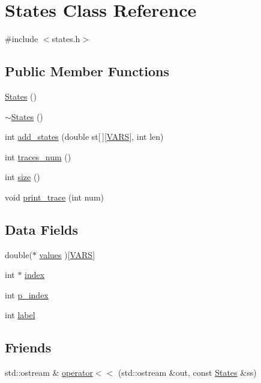 \hypertarget{classStates}{}\section{States Class Reference}
\label{classStates}


{\ttfamily \#include $<$states.\+h$>$}

\subsection*{Public Member Functions}
\begin{DoxyCompactItemize}
\item 
\hyperlink{classStates_a77357dcd7269296068b166a86c035a4b}{States} ()
\item 
\hyperlink{classStates_a537d87c299ae42198d2f21f1bb046ec3}{$\sim$\+States} ()
\item 
int \hyperlink{classStates_ad6ea525e3db09581e11a80fac83201fd}{add\+\_\+states} (double st\mbox{[}$\,$\mbox{]}\mbox{[}\hyperlink{config_8h_a1d6565a8ececd15de44965eec4790919}{V\+A\+RS}\mbox{]}, int len)
\item 
int \hyperlink{classStates_a037a0060888bb6fc519783f3f06284f4}{traces\+\_\+num} ()
\item 
int \hyperlink{classStates_aff348a13a96c0699227f0dd49af5f51c}{size} ()
\item 
void \hyperlink{classStates_a25b5dab291f24971d9ddb1ff006a7cf4}{print\+\_\+trace} (int num)
\end{DoxyCompactItemize}
\subsection*{Data Fields}
\begin{DoxyCompactItemize}
\item 
double($\ast$ \hyperlink{classStates_a8b9a87b26c50e560d98c98d7e18f36b4}{values} )\mbox{[}\hyperlink{config_8h_a1d6565a8ececd15de44965eec4790919}{V\+A\+RS}\mbox{]}
\item 
int $\ast$ \hyperlink{classStates_ac7f438346962624026633389d156b5d0}{index}
\item 
int \hyperlink{classStates_a13e3842ad77b702e0f68cf875ded9534}{p\+\_\+index}
\item 
int \hyperlink{classStates_ab444a833f85348e8a850962da6c2c987}{label}
\end{DoxyCompactItemize}
\subsection*{Friends}
\begin{DoxyCompactItemize}
\item 
std\+::ostream \& \hyperlink{classStates_a0a7f6b2b45f2366b0253093800b13fee}{operator$<$$<$} (std\+::ostream \&out, const \hyperlink{classStates}{States} \&ss)
\end{DoxyCompactItemize}


